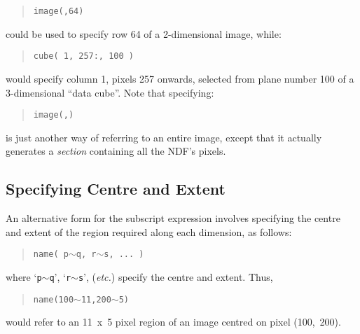\documentclass[twoside,11pt]{article}
\newcommand{\xlabel}[1]{}
\newcommand{\st}[1]{{\em{#1}}}
\newcommand{\hi}[1]{{\tt{#1}}}
\begin{document}
\small
\begin{quote}
\begin{center}
\hi{image(,64)}
\end{center}
\end{quote}
\normalsize

could be used to specify row 64 of a 2-dimensional image, while:

\small
\begin{quote}
\begin{center}
\hi{cube( 1, 257:, 100 )}
\end{center}
\end{quote}
\normalsize

would specify column 1, pixels 257 onwards, selected from plane number
100 of a 3-dimensional ``data cube''.
Note that specifying:

\small
\begin{quote}
\begin{center}
\hi{image(,)}
\end{center}
\end{quote}
\normalsize

is just another way of referring to an entire image, except that it actually
generates a \st{section\/} containing all the NDF's pixels.

\subsection{\xlabel{specifying_centre_and_extent}Specifying Centre and Extent}

An alternative form for the subscript expression involves specifying the centre
and extent of the region required along each dimension, as follows:

\small
\begin{quote}
\begin{center}
\hi{name( p}$\sim$\hi{q, r}$\sim$\hi{s, ... )}
\end{center}
\end{quote}
\normalsize

where `\hi{p}$\sim$\hi{q}', `\hi{r}$\sim$\hi{s}', (\st{etc.}) specify the
centre and extent. Thus,

\small
\begin{quote}
\begin{center}
\hi{name(100}$\sim$\hi{11,200}$\sim$\hi{5)}
\end{center}
\end{quote}
\normalsize

would refer to an 11~x~5 pixel region of an image centred on pixel (100,~200).
\end{document}

